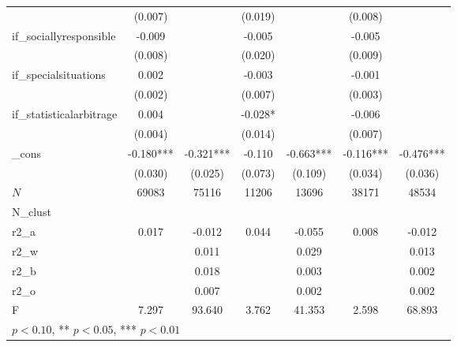 {\begin{tabular}{l*{6}{c}}
            &     (0.007)   &               &     (0.019)   &               &     (0.008)   &               \\
[1em]
if\_sociallyresponsible&      -0.009   &               &      -0.005   &               &      -0.005   &               \\
            &     (0.008)   &               &     (0.020)   &               &     (0.009)   &               \\
[1em]
if\_specialsituations&       0.002   &               &      -0.003   &               &      -0.001   &               \\
            &     (0.002)   &               &     (0.007)   &               &     (0.003)   &               \\
[1em]
if\_statisticalarbitrage&       0.004   &               &      -0.028*  &               &      -0.006   &               \\
            &     (0.004)   &               &     (0.014)   &               &     (0.007)   &               \\
[1em]
\_cons      &      -0.180***&      -0.321***&      -0.110   &      -0.663***&      -0.116***&      -0.476***\\
            &     (0.030)   &     (0.025)   &     (0.073)   &     (0.109)   &     (0.034)   &     (0.036)   \\
\hline
\(N\)       &       69083   &       75116   &       11206   &       13696   &       38171   &       48534   \\
N\_clust     &               &               &               &               &               &               \\
r2\_a        &       0.017   &      -0.012   &       0.044   &      -0.055   &       0.008   &      -0.012   \\
r2\_w        &               &       0.011   &               &       0.029   &               &       0.013   \\
r2\_b        &               &       0.018   &               &       0.003   &               &       0.002   \\
r2\_o        &               &       0.007   &               &       0.002   &               &       0.002   \\
F           &       7.297   &      93.640   &       3.762   &      41.353   &       2.598   &      68.893   \\
\hline\hline
\multicolumn{7}{l}{\footnotesize * \(p<0.10\), ** \(p<0.05\), *** \(p<0.01\)}\\
\end{tabular}
}
